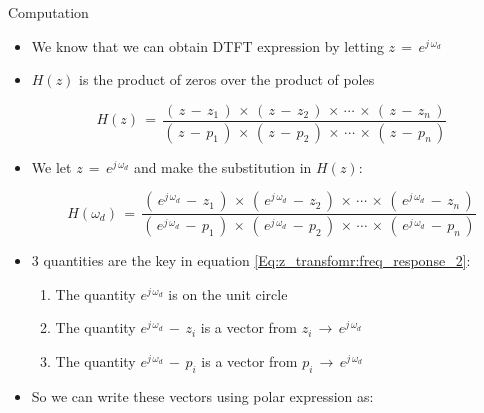 \documentclass{beamer}
\begin{document}
\begin{frame}[t,allowframebreaks]{Computation}

\begin{itemize}

\item We know that we can obtain DTFT expression by letting $z \, = \, e^{j \, \omega_d}$

\item $H(z)$ is the product of zeros over the product of poles

\begin{equation}
H(z) \, = \, \displaystyle\frac{( \, z \, - \, z_1 \,) \, \times \, ( \, z \, - \, z_2 \,) \, \times \, \cdots \, \times \, ( \, z \, - \, z_n \,)}{( \, z \, - \, p_1 \,) \, \times \,( \, z \, - \, p_2 \,) \, \times \, \cdots \, \times \,( \, z \, - \, p_n \,)}
\end{equation} 

\item We let $z \, = \,  e^{j \, \omega_d}$ and make the substitution in $H(z)$:

\begin{equation}
H(\omega_d) \, = \, \displaystyle\frac{( \,  e^{j \, \omega_d} \, - \, z_1 \,) \, \times \, ( \,  e^{j \, \omega_d} \, - \, z_2 \,) \, \times \, \cdots \, \times \, ( \,  e^{j \, \omega_d} \, - \, z_n \,)}{( \,  e^{j \, \omega_d} \, - \, p_1 \,) \, \times \,( \,  e^{j \, \omega_d} \, - \, p_2 \,) \, \times \, \cdots \, \times \,( \,  e^{j \, \omega_d} \, - \, p_n \,)}
\label{Eq:z_transfomr:freq_response_2}
\end{equation} 

\newpage

\item 3 quantities are the key in equation \autoref{Eq:z_transfomr:freq_response_2}:

	\begin{enumerate}
	\item The quantity $e^{j \, \omega_d}$ is on the unit circle
	
	\item The quantity $ e^{j \, \omega_d} \, - \, z_i$ is a vector from $z_i \, \rightarrow \, e^{j \, \omega_d}$
	
	
	\item The quantity $ e^{j \, \omega_d} \, - \, p_i$ is a vector from $p_i \, \rightarrow \, e^{j \, \omega_d}$
	\end{enumerate}


\item So we can write these vectors using polar expression as:


\end{itemize}
\end{frame}
\end{document}
